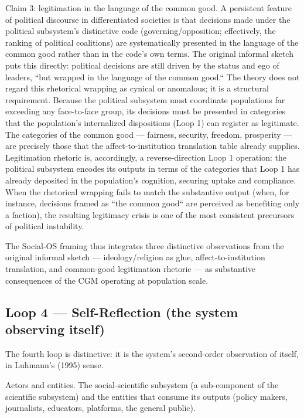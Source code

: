 \documentclass[12pt,a4paper]{article}
\begin{document}
Claim 3: legitimation in the language of the common good. A persistent feature of political discourse in differentiated societies is that decisions made under the political subsystem's distinctive code (governing/opposition; effectively, the ranking of political coalitions) are systematically presented in the language of the common good rather than in the code's own terms. The original informal sketch puts this directly: political decisions are still driven by the status and ego of leaders, ``but wrapped in the language of the common good.`` The theory does not regard this rhetorical wrapping as cynical or anomalous; it is a structural requirement. Because the political subsystem must coordinate populations far exceeding any face-to-face group, its decisions must be presented in categories that the population's internalized dispositions (Loop 1) can register as legitimate. The categories of the common good --- fairness, security, freedom, prosperity --- are precisely those that the affect-to-institution translation table already supplies. Legitimation rhetoric is, accordingly, a reverse-direction Loop 1 operation: the political subsystem encodes its outputs in terms of the categories that Loop 1 has already deposited in the population's cognition, securing uptake and compliance. When the rhetorical wrapping fails to match the substantive output (when, for instance, decisions framed as ``the common good`` are perceived as benefiting only a faction), the resulting legitimacy crisis is one of the most consistent precursors of political instability.


The Social-OS framing thus integrates three distinctive observations from the original informal sketch --- ideology/religion as glue, affect-to-institution translation, and common-good legitimation rhetoric --- as substantive consequences of the CGM operating at population scale.

\subsection{Loop 4 --- Self-Reflection (the system observing itself)}

The fourth loop is distinctive: it is the system's second-order observation of itself, in Luhmann's (1995) sense.


Actors and entities. The social-scientific subsystem (a sub-component of the scientific subsystem) and the entities that consume its outputs (policy makers, journalists, educators, platforms, the general public).
\end{document}
